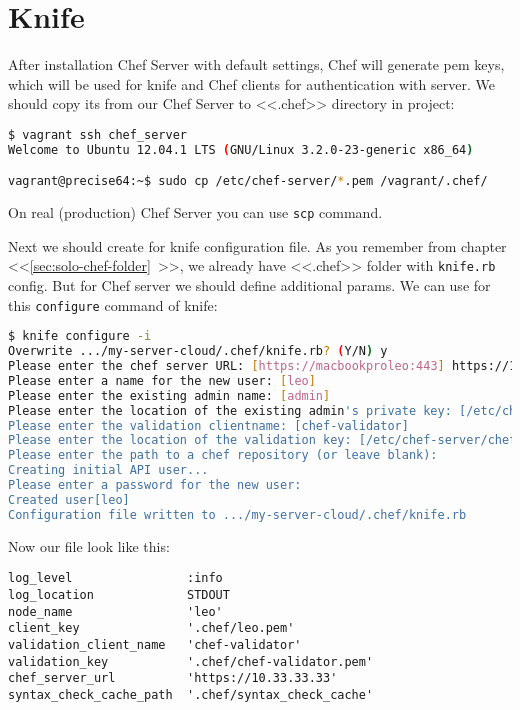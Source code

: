 \section{Knife}
\label{sec:server-knife}

After installation Chef Server with default settings, Chef will generate pem keys, which will be used for knife and Chef clients for authentication with server. We should copy its from our Chef Server to <<.chef>> directory in project:

\begin{lstlisting}[language=Bash,label=lst:my-server-cloud-knife1]
$ vagrant ssh chef_server
Welcome to Ubuntu 12.04.1 LTS (GNU/Linux 3.2.0-23-generic x86_64)

vagrant@precise64:~$ sudo cp /etc/chef-server/*.pem /vagrant/.chef/
\end{lstlisting}

On real (production) Chef Server you can use \lstinline!scp! command.

Next we should create for knife configuration file. As you remember from chapter <<\ref{sec:solo-chef-folder}~>>, we already have <<.chef>> folder with \lstinline!knife.rb! config. But for Chef server we should define additional params. We can use for this \lstinline!configure! command of knife:

\begin{lstlisting}[language=Bash,label=lst:my-server-cloud-knife2]
$ knife configure -i
Overwrite .../my-server-cloud/.chef/knife.rb? (Y/N) y
Please enter the chef server URL: [https://macbookproleo:443] https://10.33.33.33
Please enter a name for the new user: [leo]
Please enter the existing admin name: [admin]
Please enter the location of the existing admin's private key: [/etc/chef-server/admin.pem] .chef/admin.pem
Please enter the validation clientname: [chef-validator]
Please enter the location of the validation key: [/etc/chef-server/chef-validator.pem] .chef/chef-validator.pem
Please enter the path to a chef repository (or leave blank):
Creating initial API user...
Please enter a password for the new user:
Created user[leo]
Configuration file written to .../my-server-cloud/.chef/knife.rb
\end{lstlisting}

Now our file look like this:

\begin{lstlisting}[label=lst:my-server-cloud-knife3,title=my-server-cloud/.chef/knife.rb]
log_level                :info
log_location             STDOUT
node_name                'leo'
client_key               '.chef/leo.pem'
validation_client_name   'chef-validator'
validation_key           '.chef/chef-validator.pem'
chef_server_url          'https://10.33.33.33'
syntax_check_cache_path  '.chef/syntax_check_cache'
\end{lstlisting}

